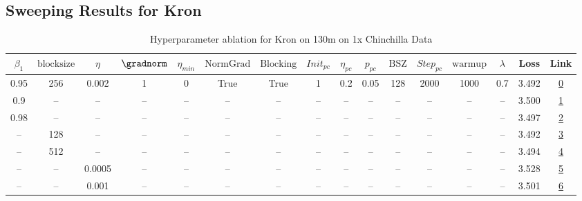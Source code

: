 \subsection{Sweeping Results for Kron}%
\begin{table}[H]
\centering
\caption{Hyperparameter ablation for Kron on 130m on 1x Chinchilla Data}
\label{tab:ablation_kron_130m_on_1x_chinchilla_data}
\begin{tabular}{cccccccccccccccc}
\toprule
$\beta_1$ & $\mathrm{block size}$ & $\eta$ & $\gradnorm$ & $\eta_{min}$ & $\mathrm{NormGrad}$ & $\mathrm{Blocking}$ & $Init_{pc}$ & $\eta_{pc}$ & $p_{pc}$ & $\mathrm{BSZ}$ & $Step_{pc}$ & $\mathrm{warmup}$ & $\lambda$ & Loss & Link \\
\midrule
0.95 & 256 & 0.002 & 1 & 0 & True & True & 1 & 0.2 & 0.05 & 128 & 2000 & 1000 & 0.7 & 3.492 & \href{https://wandb.ai/stanford-mercury/optimizer-scaling/runs/sweep-130m-2B-kron811b3clr0.002-wd0.7-b10.95-plr0.2-pis1-gn1-nor-45d11f}{0} \\
\midrule
0.9 & -- & -- & -- & -- & -- & -- & -- & -- & -- & -- & -- & -- & -- & 3.500 & \href{https://wandb.ai/stanford-mercury/optimizer-scaling/runs/sweep-130m-2B-kron18ad0flr0.002-wd0.7-b10.9-plr0.2-pis1-gn1-norm-7cd768}{1} \\
0.98 & -- & -- & -- & -- & -- & -- & -- & -- & -- & -- & -- & -- & -- & 3.497 & \href{https://wandb.ai/stanford-mercury/optimizer-scaling/runs/sweep-130m-2B-kron13e12blr0.002-wd0.7-b10.98-plr0.2-pis1-gn1-nor-259ac0}{2} \\
-- & 128 & -- & -- & -- & -- & -- & -- & -- & -- & -- & -- & -- & -- & 3.492 & \href{https://wandb.ai/stanford-mercury/optimizer-scaling/runs/sweep-130m-2B-kroncd6d30lr0.002-wd0.7-b10.95-plr0.2-pis1-gn1-nor-1527d0}{3} \\
-- & 512 & -- & -- & -- & -- & -- & -- & -- & -- & -- & -- & -- & -- & 3.494 & \href{https://wandb.ai/stanford-mercury/optimizer-scaling/runs/sweep-130m-2B-krond41926lr0.002-wd0.7-b10.95-plr0.2-pis1-gn1-nor-e72480}{4} \\
-- & -- & 0.0005 & -- & -- & -- & -- & -- & -- & -- & -- & -- & -- & -- & 3.528 & \href{https://wandb.ai/stanford-mercury/optimizer-scaling/runs/sweep-130m-2B-kron6787f2lr0.0005-wd0.7-b10.95-plr0.2-pis1-gn1-no-d99f80}{5} \\
-- & -- & 0.001 & -- & -- & -- & -- & -- & -- & -- & -- & -- & -- & -- & 3.501 & \href{https://wandb.ai/stanford-mercury/optimizer-scaling/runs/sweep-130m-2B-kron5fbd9blr0.001-wd0.7-b10.95-plr0.2-pis1-gn1-nor-fbd5ad}{6} \\

\end{tabular}
\end{table}
